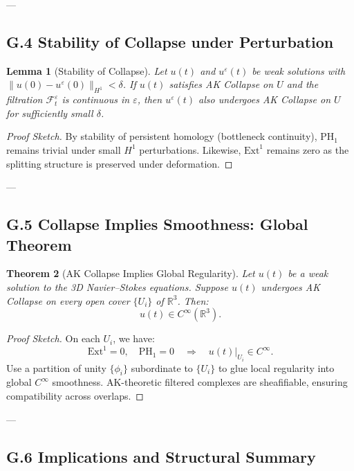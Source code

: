 \documentclass[11pt]{article}
\newtheorem{theorem}{Theorem}[section]
\newtheorem{lemma}[theorem]{Lemma}
\theoremstyle{definition}
\begin{document}
---

\subsection*{G.4 Stability of Collapse under Perturbation}

\begin{lemma}[Stability of Collapse]
Let $u(t)$ and $u^\varepsilon(t)$ be weak solutions with $\|u(0)-u^\varepsilon(0)\|_{H^1} < \delta$.  
If $u(t)$ satisfies AK Collapse on $U$ and the filtration $\mathcal{F}^\varepsilon_t$ is continuous in $\varepsilon$,  
then $u^\varepsilon(t)$ also undergoes AK Collapse on $U$ for sufficiently small $\delta$.
\end{lemma}

\begin{proof}[Proof Sketch]
By stability of persistent homology (bottleneck continuity), PH$_1$ remains trivial under small $H^1$ perturbations.  
Likewise, $\mathrm{Ext}^1$ remains zero as the splitting structure is preserved under deformation.
\end{proof}

---

\subsection*{G.5 Collapse Implies Smoothness: Global Theorem}

\begin{theorem}[AK Collapse Implies Global Regularity]
Let $u(t)$ be a weak solution to the 3D Navier–Stokes equations.  
Suppose $u(t)$ undergoes AK Collapse on every open cover $\{ U_i \}$ of $\mathbb{R}^3$.  
Then:
\[
u(t) \in C^\infty(\mathbb{R}^3).
\]
\end{theorem}

\begin{proof}[Proof Sketch]
On each $U_i$, we have:
\[
\mathrm{Ext}^1 = 0, \quad \mathrm{PH}_1 = 0 \quad \Rightarrow \quad u(t)|_{U_i} \in C^\infty.
\]
Use a partition of unity $\{\phi_i\}$ subordinate to $\{U_i\}$ to glue local regularity into global $C^\infty$ smoothness.  
AK-theoretic filtered complexes are sheafifiable, ensuring compatibility across overlaps.
\end{proof}

---

\subsection*{G.6 Implications and Structural Summary}
\end{document}
